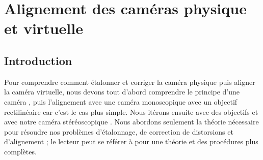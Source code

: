 



\section{Alignement des caméras physique et virtuelle}
\label{sec:cameras_alignment}

\subsection{Introduction}
\label{subsec:cameras_alignment_introduction}
Pour comprendre comment étalonner et corriger la caméra physique puis aligner la caméra virtuelle, nous devons tout d'abord comprendre le principe d'une caméra , puis l'alignement avec une caméra monoscopique avec un objectif rectilinéaire  car c'est le cas plus simple. Nous itérons ensuite avec des objectifs   et avec notre caméra stéréoscopique . Nous abordons seulement la théorie nécessaire pour résoudre nos problèmes d'étalonnage, de correction de distorsions et d'alignement ; le lecteur peut se référer à \cite[chap. 18-19]{Kaehler2017} pour une théorie et des procédures plus complètes.


